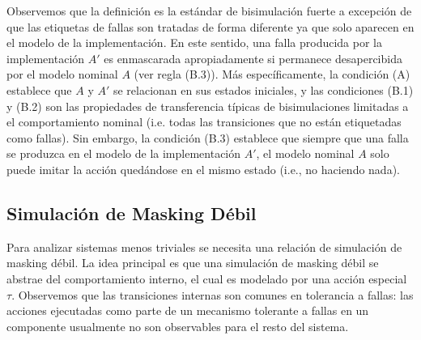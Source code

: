 Observemos que la definición es la estándar de bisimulación fuerte a excepción de que las etiquetas de fallas son tratadas de forma diferente ya que solo aparecen en el modelo de la implementación.  En este sentido, una falla producida por la implementación $A'$ es enmascarada apropiadamente si permanece desapercibida por el modelo nominal $A$ (ver regla (B.3)).
%
Más específicamente, la condición (A) establece que $A$ y $A'$ se relacionan en sus estados iniciales, y las condiciones (B.1) y (B.2) son las propiedades de transferencia típicas de bisimulaciones limitadas a el comportamiento nominal (i.e. todas las transiciones que no están etiquetadas como fallas).
%
Sin embargo, la condición (B.3) establece que siempre que una falla se produzca en el modelo de la implementación $A'$, el modelo nominal $A$ solo puede imitar la acción quedándose en el mismo estado (i.e., no haciendo nada).

\subsection{Simulación de Masking Débil}

Para analizar sistemas menos triviales se necesita una relación de simulación de masking débil. La idea principal es que una simulación de masking débil se abstrae del comportamiento interno, el cual es modelado por una acción especial $\tau$. Observemos que las transiciones internas son comunes en tolerancia a fallas: las acciones ejecutadas como parte de un mecanismo tolerante a fallas en un componente usualmente no son observables para el resto del sistema.

